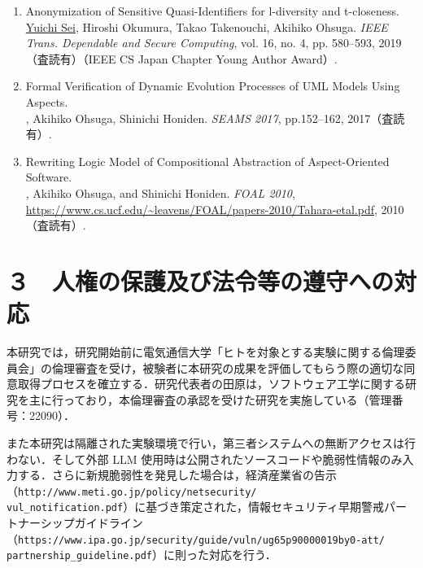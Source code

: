 \documentclass[11pt,a4j,dvipdfmx]{jarticle} 					%
\newcommand{\研究課題名}{大量の脆弱性・攻撃手段・パッチの依存関係を考慮した証明付き修正計画の自動生成}
\newcommand{\研究機関名}{電気通信大学}
\newcommand{\研究代表者氏名}{田原 康之}
\newcommand{\研究期間の最終元号年度}{12}  %
\begin{document}
\begin{enumerate}
\item\label{sei19} Anonymization of Sensitive Quasi-Identifiers for l-diversity and t-closeness.\\
  \ul{Yuichi Sei}, Hiroshi Okumura, Takao Takenouchi, Akihiko Ohsuga.
  \emph{IEEE Trans. Dependable and Secure Computing}, vol. 16, no. 4, pp. 580--593, 2019（査読有）（IEEE CS Japan Chapter Young Author Award）.

\item\label{tahara17} Formal Verification of Dynamic Evolution Processes of UML Models Using Aspects.\\
  , Akihiko Ohsuga, Shinichi Honiden.
  {\em SEAMS 2017}, pp.152--162, 2017（査読有）.

\item\label{tahara10} Rewriting Logic Model of Compositional Abstraction of Aspect-Oriented Software.\\
  , Akihiko Ohsuga, and Shinichi Honiden.
  {\em FOAL 2010}, \url{https://www.cs.ucf.edu/~leavens/FOAL/papers-2010/Tahara-etal.pdf}, 2010（査読有）.

\end{enumerate}




\section{３　人権の保護及び法令等の遵守への対応}

本研究では，研究開始前に電気通信大学「ヒトを対象とする実験に関する倫理委員会」の倫理審査を受け，被験者に本研究の成果を評価してもらう際の適切な同意取得プロセスを確立する．研究代表者の田原は，ソフトウェア工学に関する研究を主に行っており，本倫理審査の承認を受けた研究を実施している（管理番号：22090）．

また本研究は隔離された実験環境で行い，第三者システムへの無断アクセスは行わない．そして外部 LLM 使用時は公開されたソースコードや脆弱性情報のみ入力する．さらに新規脆弱性を発見した場合は，経済産業省の告示（\texttt{http://www.meti.go.jp/policy/netsecurity/}\\
\texttt{vul\_notification.pdf}）に基づき策定された，情報セキュリティ早期警戒パートナーシップガイドライン（\texttt{https://www.ipa.go.jp/security/guide/vuln/ug65p90000019by0-att/}\\
\texttt{partnership\_guideline.pdf}）に則った対応を行う．
\end{document}
